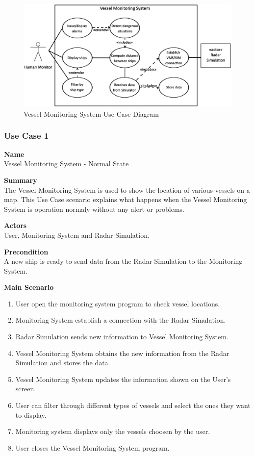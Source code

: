 \documentclass[12pt]{article}
\begin{document}
\begin{figure}[h]
\caption{Vessel Monitoring System Use Case Diagram}
\includegraphics[width=\linewidth]{vmsdiagram.eps}
\end{figure}

\subsubsection{Use Case 1} \label{uc:1}

\noindent
{\bf Name}\\
Vessel Monitoring System - Normal State

\noindent
{\bf Summary}\\
The Vessel Monitoring System is used to show the location of various vessels on a map. This Use Case scenario explains what happens
when the Vessel Monitoring System is operation normaly without any alert or problems.

\noindent
{\bf Actors}\\
User, Monitoring System and Radar Simulation.

\noindent
{\bf Precondition}\\
A new ship is ready to send data from the Radar Simulation to the Monitoring System.

\noindent
{\bf Main Scenario}\\
\vspace*{-0.2in}
\begin{enumerate}
\item User open the monitoring system program to check vessel locations.
\item Monitoring System establish a connection with the Radar Simulation.
\item Radar Simulation sends new information to Vessel Monitoring System.
\item Vessel Monitoring System obtains the new information from the Radar Simulation and stores the data.
\item Vessel Monitoring System updates the information shown on the User's screen.
\item User can filter through different types of vessels and select the ones they want to display.
\item Monitoring system displays only the vessels choosen by the user.
\item User closes the Vessel Monitoring System program.
\end{enumerate}
\end{document}
